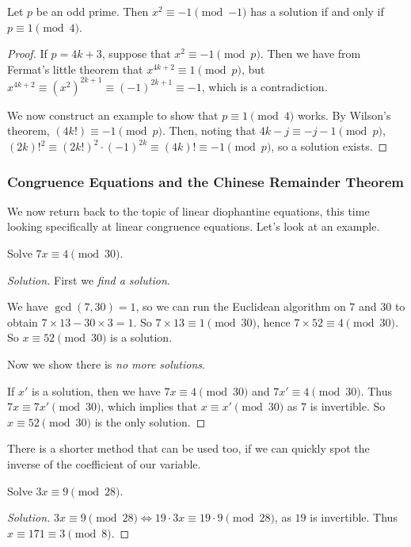 \documentclass[a4paper]{scrartcl}
\begin{document}
\begin{lemma}[$x^2 + 1$ Lemma]
	Let $p$ be an odd prime. Then $x^2 \equiv -1 \pmod{-1}$ has a solution if and only if $p \equiv 1 \pmod{4}$.
\end{lemma}
\begin{proof}
	If $p = 4k + 3$, suppose that $x^2 \equiv -1 \pmod{p}$. Then we have from Fermat's little theorem that $x^{4k + 2} \equiv 1 \pmod{p}$, but $x^{4k + 2} \equiv (x^2)^{2k + 1} \equiv (-1)^{2k + 1} \equiv -1$, which is a contradiction.

	We now construct an example to show that $p \equiv 1 \pmod{4}$ works. By Wilson's theorem, $(4k!) \equiv -1 \pmod{p}$. Then, noting that $4k - j \equiv -j - 1 \pmod{p}$, $(2k)!^2 \equiv (2k!)^2 \cdot (-1)^{2k} \equiv (4k)! \equiv -1 \pmod{p}$, so a solution exists.
\end{proof}

\subsubsection{Congruence Equations and the Chinese Remainder Theorem}

We now return back to the topic of linear diophantine equations, this time looking specifically at linear congruence equations. Let's look at an example. 

\begin{example}
	Solve $7x \equiv 4 \pmod{30}$.
\end{example}
\begin{proof}[Solution]
	First we \emph{find a solution}.

	We have $\gcd(7, 30) = 1$, so we can run the Euclidean algorithm on $7$ and $30$ to obtain $7 \times 13 - 30 \times 3 = 1$. So $7 \times 13 \equiv 1 \pmod{30}$, hence $7 \times 52 \equiv 4 \pmod{30}$. So $x \equiv 52 \pmod{30}$ is a solution.

	Now we show there is \emph{no more solutions}.

	If $x'$ is a solution, then we have $7x \equiv 4 \pmod{30}$ and $7x' \equiv 4 \pmod{30}$. Thus $7x \equiv 7x' \pmod{30}$, which implies that $x \equiv x' \pmod{30}$ as $7$ is invertible.
	So $x \equiv 52 \pmod{30}$ is the only solution.
\end{proof}

There is a shorter method that can be used too, if we can quickly spot the inverse of the coefficient of our variable.

\begin{example}
	Solve $3x \equiv 9 \pmod{28}$.
\end{example}
\begin{proof}[Solution]
	$3x \equiv 9 \pmod{28} \iff 19 \cdot 3 x \equiv 19 \cdot 9 \pmod{28}$, as $19$ is invertible. Thus $x \equiv 171 \equiv 3 \pmod{8}$.
\end{proof}
\end{document}
